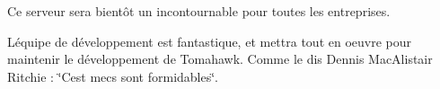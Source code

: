 Ce serveur sera bientôt un incontournable pour toutes les entreprises.

L\textquotesingle{}équipe de développement est fantastique, et mettra tout en oeuvre pour maintenir le développement de Tomahawk. Comme le dis Dennis Mac\+Alistair Ritchie \+: \char`\"{}\+C\textquotesingle{}est mecs sont formidables\char`\"{}.